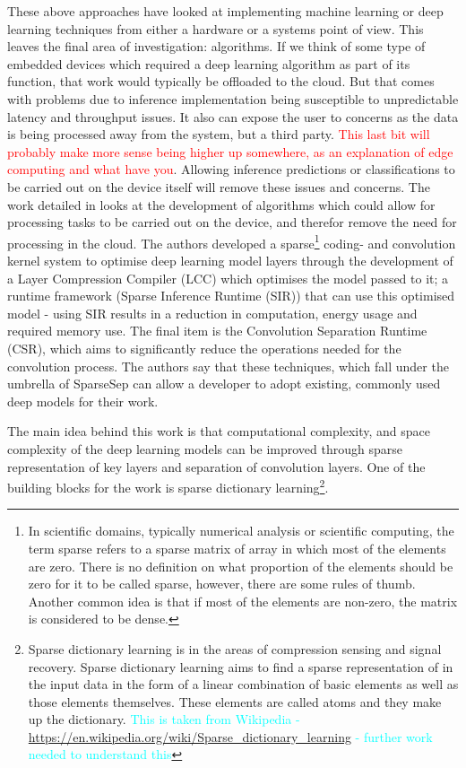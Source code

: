 \documentclass[conference]{IEEEtran}
\begin{document}
These above approaches have looked at implementing machine learning or deep learning techniques from either a hardware or a systems point of view. This leaves the final area of investigation: algorithms. If we think of some type of embedded devices which required a deep learning algorithm as part of its function, that work would typically be offloaded to the cloud. But that comes with problems due to inference implementation being susceptible to unpredictable latency and throughput issues. It also can expose the user to concerns as the data is being processed away from the system, but a third party. \textcolor{red}{This last bit will probably make more sense being higher up somewhere, as an explanation of edge computing and what have you}. Allowing inference predictions or classifications to be carried out on the device itself will remove these issues and concerns. The work detailed in \cite{Bhattacharya2016} looks at the development of algorithms which could allow for processing tasks to be carried out on the device, and therefor remove the need for processing in the cloud. The authors developed a sparse\footnote{In scientific domains, typically numerical analysis or scientific computing, the term sparse refers to a sparse matrix of array in which most of the elements are zero. There is no definition on what proportion of the elements should be zero for it to be called sparse, however, there are some rules of thumb. Another common idea is that if most of the elements are non-zero, the matrix is considered to be dense.} coding- and convolution kernel system to optimise deep learning model layers through the development of a Layer Compression Compiler (LCC) which optimises the model passed to it; a runtime framework (Sparse Inference Runtime (SIR)) that can use this optimised model - using SIR results in a reduction in computation, energy usage and required memory use. The final item is the Convolution Separation Runtime (CSR), which aims to significantly reduce the operations needed for the convolution process. The authors say that these techniques, which fall under the umbrella of SparseSep can allow a developer to adopt existing, commonly used deep models for their work. 

The main idea behind this work is that computational complexity, and space complexity of the deep learning models can be improved through sparse representation of key layers and separation of convolution layers. One of the building blocks for the work is sparse dictionary learning\footnote{Sparse dictionary learning is in the areas of compression sensing and signal recovery. Sparse dictionary learning aims to find a sparse representation of in the input data in the form of a linear combination of basic elements as well as those elements themselves. These elements are called atoms and they make up the dictionary. \textcolor{cyan}{This is taken from Wikipedia - \url{https://en.wikipedia.org/wiki/Sparse_dictionary_learning} - further work needed to understand this}}.
\end{document}
